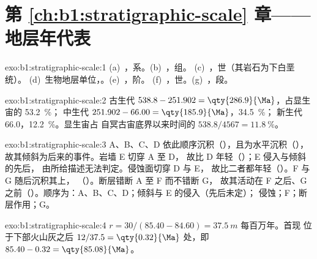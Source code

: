 \section*{第 \ref{ch:b1:stratigraphic-scale} 章——地层年代表}

\begin{solution}{exo:b1:stratigraphic-scale:1}
(a)~，系。(b)~，组。
(c)~，世（其岩石为下白垩统）。
(d)~生物地层单位，。(e)~，阶。
(f)~，世。(g)~，段。
\end{solution}

\begin{solution}{exo:b1:stratigraphic-scale:2}
古生代 $538.8 - 251.902 = \qty{286.9}{\Ma}$，占显生宙的 \qty{53.2}{\%}；
中生代 $251.902 - 66.00 = \qty{185.9}{\Ma}$，\qty{34.5}{\%}；
新生代 \qty{66.0}{\Ma}，\qty{12.2}{\%}。显生宙占
自冥古宙底界以来时间的 $538.8/4567 = \qty{11.8}{\%}$。
\end{solution}

\begin{solution}{exo:b1:stratigraphic-scale:3}
A、B、C、D 依此顺序沉积（），且为水平沉积（），
故其倾斜为后来的事件。岩墙 E 切穿 A 至 D，
故比 D 年轻（）；E 侵入与倾斜的先后，
由所给描述无法判定。侵蚀面切穿 D 与 E，
故比二者都年轻（）。F 与 G 随后沉积其上，
（）。断层错断 A 至 F 而不错断 G，
故其活动在 F 之后、G 之前（）。顺序为：A、B、C、D；倾斜与 E 的侵入（先后未定）；
侵蚀；F；断层作用；G。
\end{solution}

\begin{solution}{exo:b1:stratigraphic-scale:4}
$r = 30/(85.40 - 84.60) = \qty{37.5}{m}$ 每百万年。首现
位于下部火山灰之后 $12/37.5 = \qty{0.32}{\Ma}$ 处，即 $85.40 - 0.32 =
\qty{85.08}{\Ma}$。
\end{solution}

